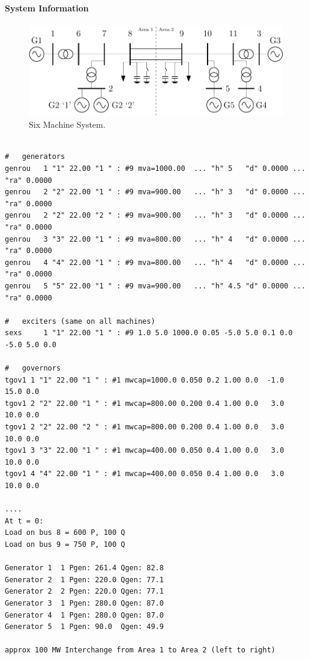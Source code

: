 \documentclass[12pt]{article}
\begin{document}
\paragraph{System Information}
\newcommand{\figW}{1}
	\begin{figure}[h!]
			\centering
			\includegraphics[width=\figW\linewidth]{../../models/sixMachine/sixMachine.pdf}\vspace{-.5em}
			\caption{Six Machine System.}
			\label{system}		 
	\end{figure}%
\begin{Verbatim}

#   generators
genrou   1 "1" 22.00 "1 " : #9 mva=1000.00  ... "h" 5   "d" 0.0000 ... "ra" 0.0000 
genrou   2 "2" 22.00 "1 " : #9 mva=900.00   ... "h" 3   "d" 0.0000 ... "ra" 0.0000 
genrou   2 "2" 22.00 "2 " : #9 mva=900.00   ... "h" 3   "d" 0.0000 ... "ra" 0.0000  
genrou   3 "3" 22.00 "1 " : #9 mva=800.00   ... "h" 4   "d" 0.0000 ... "ra" 0.0000
genrou   4 "4" 22.00 "1 " : #9 mva=800.00   ... "h" 4   "d" 0.0000 ... "ra" 0.0000  
genrou   5 "5" 22.00 "1 " : #9 mva=900.00   ... "h" 4.5 "d" 0.0000 ... "ra" 0.0000  

#   exciters (same on all machines)
sexs     1 "1" 22.00 "1 " : #9 1.0 5.0 1000.0 0.05 -5.0 5.0 0.1 0.0 -5.0 5.0 0.0

#   governors
tgov1 1 "1" 22.00 "1 " : #1 mwcap=1000.0 0.050 0.2 1.00 0.0  -1.0  15.0 0.0
tgov1 2 "2" 22.00 "1 " : #1 mwcap=800.00 0.200 0.4 1.00 0.0   3.0  10.0 0.0
tgov1 2 "2" 22.00 "2 " : #1 mwcap=800.00 0.200 0.4 1.00 0.0   3.0  10.0 0.0
tgov1 3 "3" 22.00 "1 " : #1 mwcap=400.00 0.050 0.4 1.00 0.0   3.0  10.0 0.0
tgov1 4 "4" 22.00 "1 " : #1 mwcap=400.00 0.050 0.4 1.00 0.0   3.0  10.0 0.0

....
At t = 0:
Load on bus 8 = 600 P, 100 Q
Load on bus 9 = 750 P, 100 Q

Generator 1  1 Pgen: 261.4 Qgen: 82.8
Generator 2  1 Pgen: 220.0 Qgen: 77.1
Generator 2  2 Pgen: 220.0 Qgen: 77.1
Generator 3  1 Pgen: 280.0 Qgen: 87.0
Generator 4  1 Pgen: 280.0 Qgen: 87.0
Generator 5  1 Pgen: 90.0  Qgen: 49.9

approx 100 MW Interchange from Area 1 to Area 2 (left to right)
\end{Verbatim}
\end{document}
